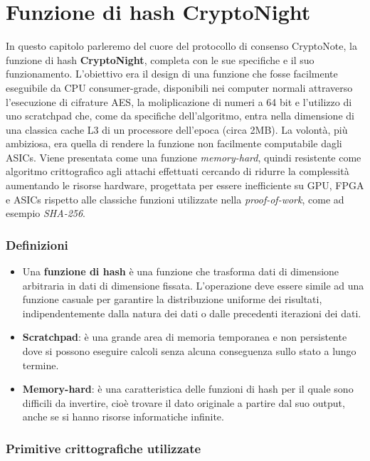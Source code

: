 \section{Funzione di hash
CryptoNight}\label{funzione-di-hash-cryptonight}

In questo capitolo parleremo del cuore del protocollo di consenso
CryptoNote, la funzione di hash \textbf{CryptoNight}, completa con le
sue specifiche e il suo funzionamento. L'obiettivo era il design di una
funzione che fosse facilmente eseguibile da CPU consumer-grade,
disponibili nei computer normali attraverso l'esecuzione di cifrature
AES, la moliplicazione di numeri a 64 bit e l'utilizzo di uno scratchpad
che, come da specifiche dell'algoritmo, entra nella dimensione di una
classica cache L3 di un processore dell'epoca (circa 2MB). La volontà,
più ambiziosa, era quella di rendere la funzione non facilmente
computabile dagli ASICs. Viene presentata come una funzione
\emph{memory-hard}, quindi resistente come algoritmo crittografico agli
attachi effettuati cercando di ridurre la complessità aumentando le
risorse hardware, progettata per essere inefficiente su GPU, FPGA e
ASICs rispetto alle classiche funzioni utilizzate nella
\emph{proof-of-work}, come ad esempio \emph{SHA-256}.

\subsubsection{Definizioni}\label{definizioni}

\begin{itemize}
\item
  Una \textbf{funzione di hash} è una funzione che trasforma dati di
  dimensione arbitraria in dati di dimensione fissata. L'operazione deve
  essere simile ad una funzione casuale per garantire la distribuzione
  uniforme dei risultati, indipendentemente dalla natura dei dati o
  dalle precedenti iterazioni dei dati.
\item
  \textbf{Scratchpad}: è una grande area di memoria temporanea e non
  persistente dove si possono eseguire calcoli senza alcuna conseguenza
  sullo stato a lungo termine.
\item
  \textbf{Memory-hard}: è una caratteristica delle funzioni di hash per
  il quale sono difficili da invertire, cioè trovare il dato originale a
  partire dal suo output, anche se si hanno risorse informatiche
  infinite.
\end{itemize}

\subsubsection{Primitive crittografiche
utilizzate}\label{primitive-crittografiche-utilizzate}

